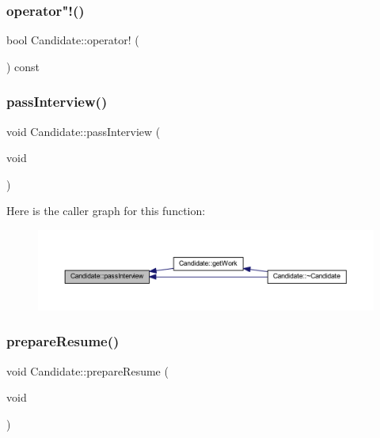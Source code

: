 \hypertarget{class_candidate_a8bfcd5a62801d4b6df95cf2ba29cf89d}{}\label{class_candidate_a8bfcd5a62801d4b6df95cf2ba29cf89d} 
\subsubsection{\texorpdfstring{operator"!()}{operator!()}}
{\footnotesize\ttfamily bool Candidate\+::operator! (\begin{DoxyParamCaption}{ }\end{DoxyParamCaption}) const\hspace{0.3cm}{\ttfamily [inline]}}

\hypertarget{class_candidate_ace55597a36842de9f9a44abf59be4eb2}{}\label{class_candidate_ace55597a36842de9f9a44abf59be4eb2} 
\subsubsection{\texorpdfstring{pass\+Interview()}{passInterview()}}
{\footnotesize\ttfamily void Candidate\+::pass\+Interview (\begin{DoxyParamCaption}\item[{void}]{ }\end{DoxyParamCaption})}

Here is the caller graph for this function\+:
\nopagebreak
\begin{figure}[H]
\begin{center}
\leavevmode
\includegraphics[width=350pt]{class_candidate_ace55597a36842de9f9a44abf59be4eb2_icgraph}
\end{center}
\end{figure}
\hypertarget{class_candidate_afee91575da03a495aad2f45f84ae341c}{}\label{class_candidate_afee91575da03a495aad2f45f84ae341c} 
\subsubsection{\texorpdfstring{prepare\+Resume()}{prepareResume()}}
{\footnotesize\ttfamily void Candidate\+::prepare\+Resume (\begin{DoxyParamCaption}\item[{void}]{ }\end{DoxyParamCaption})}

